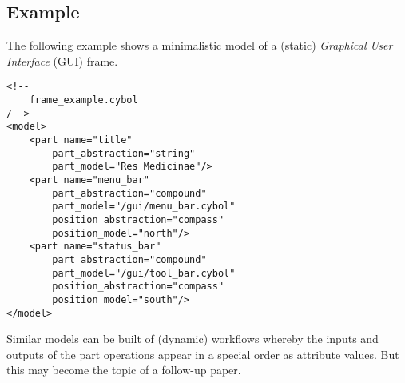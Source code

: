 %
%
%
%
%
%
%

\subsection{Example}
\label{example_heading}

The following example shows a minimalistic model of a (static) \emph{Graphical
User Interface} (GUI) frame.

\begin{verbatim}
<!--
    frame_example.cybol
/-->
<model>
    <part name="title"
        part_abstraction="string"
        part_model="Res Medicinae"/>
    <part name="menu_bar"
        part_abstraction="compound"
        part_model="/gui/menu_bar.cybol"
        position_abstraction="compass"
        position_model="north"/>
    <part name="status_bar"
        part_abstraction="compound"
        part_model="/gui/tool_bar.cybol"
        position_abstraction="compass"
        position_model="south"/>
</model>
\end{verbatim}

Similar models can be built of (dynamic) workflows whereby the inputs and outputs
of the part operations appear in a special order as attribute values. But this
may become the topic of a follow-up paper.
